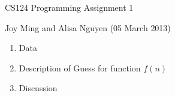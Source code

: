 \documentclass[11pt]{article}
\begin{document}
\begin{center}
\large
CS124 Programming Assignment 1
\end{center}
Joy Ming and Alisa Nguyen (05 March 2013)\\

\begin{enumerate}
\setcounter{enumi}{0}
\item Data
\item Description of Guess for function $f(n)$
\item Discussion
\end{enumerate}
\end{document}
